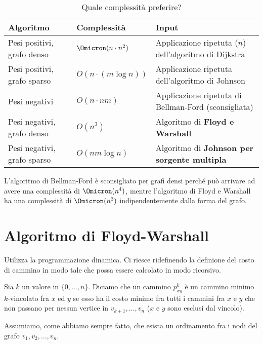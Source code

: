 \begin{table}[H]\centering
	\caption{Quale complessità preferire?}%
	\label{tab:complexity-compared}
	\begin{tabular}{@{} *{3}{l} @{}}
		\toprule
			\textbf{Algoritmo} & \textbf{Complessità} & \textbf{Input}\\
		\midrule
			Pesi positivi, grafo denso & \(\Omicron(n \cdot n^2)\) & Applicazione ripetuta (\(n\)) dell'algoritmo di Dijkstra \\
		\lightrule
			Pesi positivi, grafo sparso & \(O(n \cdot (m \log n))\) & Applicazione ripetuta dell'algoritmo di Johnson \\
		\lightrule
			Pesi negativi & \(O(n \cdot nm)\) & Applicazione ripetuta di Bellman-Ford (sconsigliata) \\
		\lightrule
			Pesi negativi, grafo denso & \(O(n^3)\) & Algoritmo di \textbf{Floyd e Warshall} \\
		\lightrule
			Pesi negativi, grafo sparso & \(O(nm \log n)\) & Algoritmo di \textbf{Johnson per sorgente multipla}\\
		\bottomrule
	\end{tabular}
\end{table}

L'algoritmo di Bellman-Ford è sconsigliato per grafi densi perché può arrivare ad avere una complessità di \(\Omicron(n^4)\), mentre l'algoritmo di Floyd e Warshall ha una complessità di \(\Omicron(n^3)\) indipendentemente dalla forma del grafo.

\section{Algoritmo di Floyd-Warshall}

Utilizza la programmazione dinamica.
Ci riesce ridefinendo la definione del costo di cammino in modo tale che possa essere calcolato in modo ricorsivo.

\begin{definition}
Sia \(k\) un valore in \(\{0, \dots, n\}\).
Diciamo che un cammino \(p_{xy}^{k}\) è un cammino minimo \(k\)-vincolato fra \(x\) ed \(y\) se esso ha il costo minimo fra tutti i cammini fra \(x\) e \(y\) che non passano per nessun vertice in \(v_{k+1}, \dots, v_n\) (\(x\) e \(y\) sono esclusi dal vincolo).
\end{definition}

\begin{note}
Assumiamo, come abbiamo sempre fatto, che esista un ordinamento fra i nodi del grafo \(v_1, v_2, \dots, v_n\).
\end{note}

